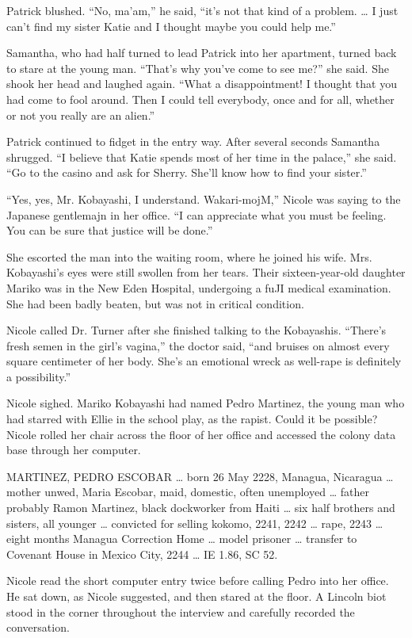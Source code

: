 \documentclass[]{article}
\begin{document}
{Patrick blushed.  “No, ma’am,” he said, “it’s not that kind of a problem.  … I just can’t find my sister Katie and I thought maybe you could help me.”

Samantha, who had half turned to lead Patrick into her apartment, turned back to stare at the young man.  “That’s why you’ve come to see me?” she said.  She shook her head and laughed again.  “What a disappointment! I thought that you had come to fool around.  Then I could tell everybody, once and for all, whether or not you really are an alien.”

Patrick continued to fidget in the entry way.  After several seconds Samantha shrugged.  “I believe that Katie spends most of her time in the palace,” she said.  “Go to the casino and ask for Sherry.  She’ll know how to find your sister.”

“Yes, yes, Mr.  Kobayashi, I understand.  Wakari-mojM,” Nicole was saying to the Japanese gentlemajn in her office.  “I can appreciate what you must be feeling.  You can be sure that justice will be done.”

She escorted the man into the waiting room, where he joined his wife.  Mrs.  Kobayashi’s eyes were still swollen from her tears.  Their sixteen-year-old daughter Mariko was in the New Eden Hospital, undergoing a fuJI medical examination.  She had been badly beaten, but was not in critical condition.

Nicole called Dr.  Turner after she finished talking to the Kobayashis.  “There’s fresh semen in the girl’s vagina,” the doctor said, “and bruises on almost every square centimeter of her body.  She’s an emotional wreck as well-rape is definitely a possibility.”

Nicole sighed.  Mariko Kobayashi had named Pedro Martinez, the young man who had starred with Ellie in the school play, as the rapist.  Could it be possible? Nicole rolled her chair across the floor of her office and accessed the colony data base through her computer.

MARTINEZ, PEDRO ESCOBAR … born 26 May 2228, Managua, Nicaragua … mother unwed, Maria Escobar, maid, domestic, often unemployed … father probably Ramon Martinez, black dockworker from Haiti … six half brothers and sisters, all younger … convicted for selling kokomo, 2241, 2242 … rape, 2243 … eight months Managua Correction Home … model prisoner … transfer to Covenant House in Mexico City, 2244 … IE 1.86, SC 52.

Nicole read the short computer entry twice before calling Pedro into her office.  He sat down, as Nicole suggested, and then stared at the floor.  A Lincoln biot stood in the corner throughout the interview and carefully recorded the conversation.

}
\end{document}

